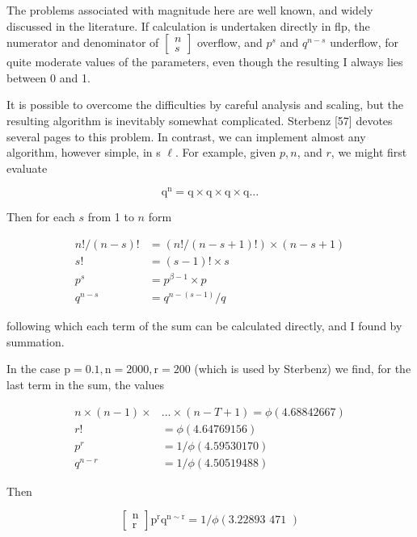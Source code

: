 \documentclass[10pt]{article}
\begin{document}
The problems associated with magnitude here are well known, and widely discussed in the literature. If calculation is undertaken directly in flp, the numerator and denominator of $\left[\begin{array}{l}n \\ s\end{array}\right]$ overflow, and $p^{s}$ and $q^{n-s}$ underflow, for quite moderate values of the parameters, even though the resulting I always lies between 0 and 1.

It is possible to overcome the difficulties by careful analysis and scaling, but the resulting algorithm is inevitably somewhat complicated. Sterbenz [57] devotes several pages to this problem. In contrast, we can implement almost any algorithm, however simple, in s $\ell$. For example, given $p, n$, and $r$, we might first evaluate

$$
\mathrm{q}^{\mathrm{n}}=\mathrm{q} \times \mathrm{q} \times \mathrm{q} \times \mathrm{q} \ldots
$$

Then for each $s$ from 1 to $n$ form

$$
\begin{aligned}
n!/(n-s)! & =(n!/(n-s+1)!) \times(n-s+1) \\
s! & =(s-1)!\times s \\
p^{s} & =p^{\beta-1} \times p \\
q^{n-s} & =q^{n-(s-1)} / q
\end{aligned}
$$

following which each term of the sum can be calculated directly, and I found by summation.

In the case $\mathrm{p}=0.1, \mathrm{n}=2000, \mathrm{r}=200$ (which is used by Sterbenz) we find, for the last term in the sum, the values

$$
\begin{aligned}
n \times(n-1) \times & \ldots \times(n-T+1)=\phi(4.68842667) \\
r! & =\phi(4.64769156) \\
p^{r} & =1 / \phi(4.59530170) \\
q^{n-r} & =1 / \phi(4.50519488)
\end{aligned}
$$

Then

$$
\left[\begin{array}{l}
\mathrm{n} \\
\mathrm{r}
\end{array}\right] \mathrm{p}^{\mathrm{r}} \mathrm{q}^{\mathrm{n} \sim \mathrm{r}}=1 / \phi(3.22893 \text { 471 })
$$
\end{document}
